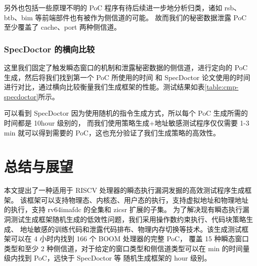 另外也包括一些原理不明的 PoC 程序有待后续进一步地分析归类，诸如 rsb、btb、bim 等前端部件也有被作为侧信道的可能。
故而我们的秘密数据泄露 PoC 至少覆盖了 cache、port 两种侧信道。\par

\subsubsection{SpecDoctor 的横向比较}

这里我们固定了触发瞬态窗口的机制和泄露秘密数据的侧信道，进行定向的 PoC 生成，然后将我们找到第一个 PoC 所使用的时间
和 SpecDoctor 论文使用的时间进行对比，通过横向比较衡量我们生成框架的性能。测试结果如表\ref{table:cmp-specdoctor}所示。\par

\begin{table}[h!]
    \begin{center} 
    \caption{与 SpecDoctor 的性能比较} 
    \label{table:cmp-specdoctor}  
    \end{center}
\end{table}

可以看到 SpecDoctor 因为使用随机的指令生成方式，所以每个 PoC 生成所需的时间都是 10hour 级别的，
而我们使用策略生成+地址敏感测试程序仅仅需要 1-3 min 就可以得到需要的 PoC，这也充分验证了我们生成策略的高效性。\par

\cleardoublepage
\section{总结与展望}

本文提出了一种适用于 RISCV 处理器的瞬态执行漏洞发掘的高效测试程序生成框架。
该框架可以支持物理态、内核态、用户态的执行，支持虚拟地址和物理地址的执行，支持 rv64imafdc 的全集和 zicsr 扩展的子集。
为了解决现有瞬态执行漏洞测试生成框架随机生成的低效性问题，我们采用操作数约束执行、代码块策略生成、
地址敏感的训练代码和泄露代码排布、物理内存切换等技术。该生成测试框架可以在 4 小时内找到 166 个 BOOM 处理器的完整 PoC，
覆盖 15 种瞬态窗口类型和至少 2 种侧信道，对于给定的窗口类型和侧信道类型可以在 min 的时间量级内找到 PoC，远快于 SpecDoctor 等
随机生成框架的 hour 级别。\par

